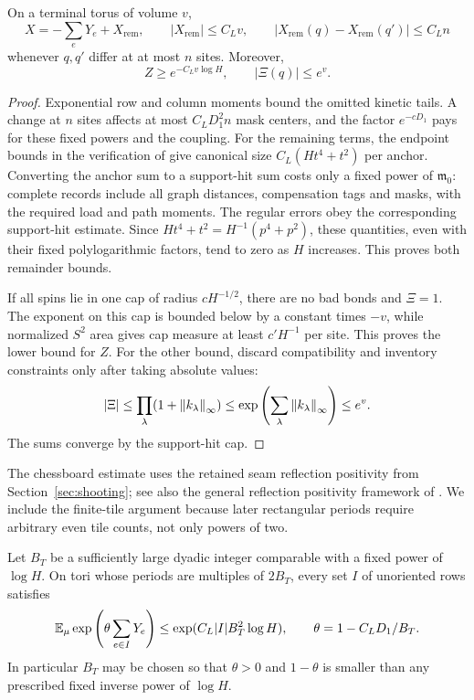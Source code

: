 \begin{lemma}
\label{lem:comparison-remainder}
On a terminal torus of volume $v$,
\begin{equation}
 X=-\sum_eY_e+X_{\mathrm{rem}},\qquad
 |X_{\mathrm{rem}}|\le C_Lv,
 \qquad
 |X_{\mathrm{rem}}(q)-X_{\mathrm{rem}}(q')|\le C_Ln
 \label{eq:orig-17}
\end{equation}
whenever $q,q'$ differ at at most $n$ sites. Moreover,
\begin{equation}
 Z\ge e^{-C_Lv\log H},\qquad |\Xi(q)|\le e^v.
 \label{eq:orig-18}
\end{equation}
\end{lemma}

\begin{proof}
Exponential row and column moments bound the omitted kinetic tails.
A change at $n$ sites affects at most $C_LD_1^2n$ mask centers, and
the factor $e^{-cD_1}$ pays for these fixed powers and the coupling.
For the remaining terms, the endpoint bounds in the verification of
 give canonical size
$C_L(Ht^4+t^2)$ per anchor. Converting the anchor sum to a support-hit
sum costs only a fixed power of $\mathfrak m_0$: complete records
include all graph distances, compensation tags and masks, with the
required load and path moments. The regular errors obey the
corresponding support-hit estimate. Since
$Ht^4+t^2=H^{-1}(p^4+p^2)$, these quantities, even with their fixed
polylogarithmic factors, tend to zero as $H$ increases. This proves
both remainder bounds.

If all spins lie in one cap of radius $cH^{-1/2}$, there are no bad
bonds and $\Xi=1$. The exponent on this cap is bounded below by a
constant times $-v$, while normalized $S^2$ area gives cap measure
at least $c'H^{-1}$ per site. This proves the lower bound for $Z$.
For the other bound, discard compatibility and inventory constraints
only after taking absolute values:
\[
 |\Xi|\le\prod_\lambda(1+\left\lVert k_\lambda\right\rVert_\infty)
 \le\exp\left(\sum_\lambda\left\lVert k_\lambda\right\rVert_\infty\right)
 \le e^v.
\]
The sums converge by the support-hit cap.
\end{proof}

The chessboard estimate uses the retained seam reflection positivity
from Section~\ref{sec:shooting}; see also the general reflection
positivity framework of \cite{FILS78,FILS80}. We include the finite-tile
argument because later rectangular periods require arbitrary even
tile counts, not only powers of two.

\begin{lemma}
\label{lem:row-exponential-moment}
Let $B_T$ be a sufficiently large dyadic integer comparable with a
fixed power of $\log H$. On tori whose periods are multiples of
$2B_T$, every set $I$ of unoriented rows satisfies
\begin{equation}
 \mathbb E_\mu\exp\left(\theta\sum_{e\in I}Y_e\right)
 \le\exp(C_L|I|B_T^2\log H),
 \qquad \theta=1-C_LD_1/B_T.
 \label{eq:orig-19}
\end{equation}
In particular $B_T$ may be chosen so that $\theta>0$ and
$1-\theta$ is smaller than any prescribed fixed inverse power of
$\log H$.
\end{lemma}

